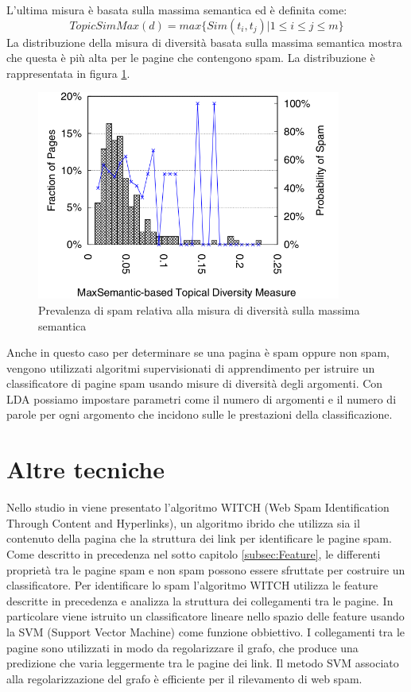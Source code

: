L'ultima misura è basata sulla massima semantica ed è definita come:
\begin{equation}
TopicSimMax(d)= max\{Sim(t_i,t_j)|1 \leq i \leq j \leq m \}
\end{equation}
La distribuzione della misura di diversità basata sulla massima semantica mostra che questa è più alta per le pagine che contengono spam. La distribuzione è rappresentata in figura \ref{fig:zhou4}.
\begin{figure}	
\centering
\includegraphics[width=10cm]{immagini/zhou/immagine4}
\caption{Prevalenza di spam relativa alla misura di diversità sulla massima semantica}
\label{fig:zhou4}
\end{figure}

Anche in questo caso per determinare se una pagina è spam oppure non spam, vengono utilizzati algoritmi supervisionati di apprendimento per istruire un classificatore di pagine spam usando misure di diversità degli argomenti. Con LDA possiamo impostare parametri come il numero di argomenti e il numero di parole per ogni argomento che incidono sulle le prestazioni della classificazione.

\section{Altre tecniche}
Nello studio in \cite{Abernethy:2008:WSI:1451983.1451994} viene presentato  l'algoritmo WITCH (Web Spam Identification Through Content and Hyperlinks), un algoritmo ibrido che utilizza sia il contenuto della pagina che la struttura dei link per identificare le pagine spam. Come descritto in precedenza nel sotto capitolo \ref{subsec:Feature}, le differenti proprietà tra le pagine spam e non spam possono essere sfruttate per costruire un classificatore. Per identificare lo spam l'algoritmo WITCH  utilizza le feature descritte in precedenza e analizza la struttura dei collegamenti tra le pagine. In particolare viene istruito un classificatore lineare nello spazio delle feature usando la SVM (Support Vector Machine) come funzione obbiettivo. I collegamenti tra le pagine sono utilizzati in modo da regolarizzare il grafo, che produce una predizione che varia leggermente tra le pagine dei link. Il metodo SVM associato alla regolarizzazione del grafo è efficiente per il rilevamento di web spam. 

